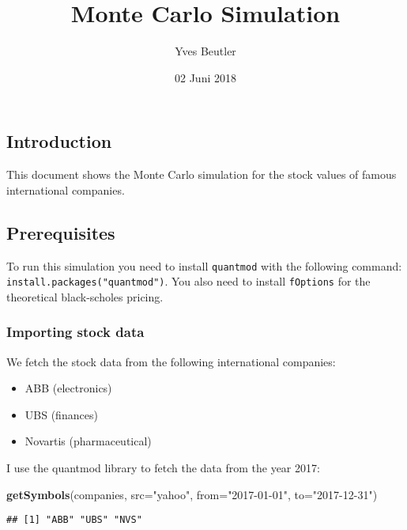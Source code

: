 \documentclass[]{article}
\title{Monte Carlo Simulation}
\author{Yves Beutler}
\date{02 Juni 2018}
\newenvironment{Shaded}{\begin{snugshade}}{\end{snugshade}}
\newcommand{\KeywordTok}[1]{\textcolor[rgb]{0.13,0.29,0.53}{\textbf{#1}}}
\newcommand{\DataTypeTok}[1]{\textcolor[rgb]{0.13,0.29,0.53}{#1}}
\newcommand{\StringTok}[1]{\textcolor[rgb]{0.31,0.60,0.02}{#1}}
\newcommand{\NormalTok}[1]{#1}
\providecommand{\tightlist}{%
  \setlength{\itemsep}{0pt}\setlength{\parskip}{0pt}}
\begin{document}
\maketitle

\subsection{Introduction}\label{introduction}

This document shows the Monte Carlo simulation for the stock values of
famous international companies.

\subsection{Prerequisites}\label{prerequisites}

To run this simulation you need to install \texttt{quantmod} with the
following command: \texttt{install.packages("quantmod")}. You also need
to install \texttt{fOptions} for the theoretical black-scholes pricing.

\subsubsection{Importing stock data}\label{importing-stock-data}

We fetch the stock data from the following international companies:

\begin{itemize}
\tightlist
\item
  ABB (electronics)
\item
  UBS (finances)
\item
  Novartis (pharmaceutical)
\end{itemize}

I use the quantmod library to fetch the data from the year 2017:

\begin{Shaded}
\begin{Highlighting}[]
\KeywordTok{getSymbols}\NormalTok{(companies, }\DataTypeTok{src=}\StringTok{"yahoo"}\NormalTok{, }\DataTypeTok{from=}\StringTok{"2017-01-01"}\NormalTok{, }\DataTypeTok{to=}\StringTok{"2017-12-31"}\NormalTok{)}
\end{Highlighting}
\end{Shaded}

\begin{verbatim}
## [1] "ABB" "UBS" "NVS"
\end{verbatim}
\end{document}
